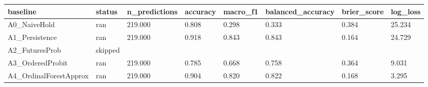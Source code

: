 \begin{tabular}{llllllll}
\toprule
baseline & status & n_predictions & accuracy & macro_f1 & balanced_accuracy & brier_score & log_loss \\
\midrule
A0_NaiveHold & ran & 219.000 & 0.808 & 0.298 & 0.333 & 0.384 & 25.234 \\
A1_Persistence & ran & 219.000 & 0.918 & 0.843 & 0.843 & 0.164 & 24.729 \\
A2_FuturesProb & skipped &  &  &  &  &  &  \\
A3_OrderedProbit & ran & 219.000 & 0.785 & 0.668 & 0.758 & 0.364 & 9.031 \\
A4_OrdinalForestApprox & ran & 219.000 & 0.904 & 0.820 & 0.822 & 0.168 & 3.295 \\
\bottomrule
\end{tabular}
